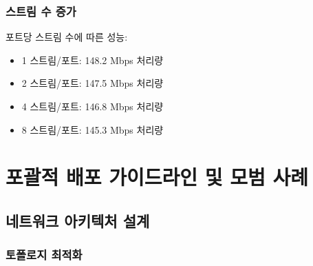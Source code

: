 \documentclass[twocolumn,10pt]{article}
\begin{document}
\subsubsection{스트림 수 증가}

포트당 스트림 수에 따른 성능:

\begin{itemize}
    \item 1 스트림/포트: 148.2 Mbps 처리량
    \item 2 스트림/포트: 147.5 Mbps 처리량
    \item 4 스트림/포트: 146.8 Mbps 처리량
    \item 8 스트림/포트: 145.3 Mbps 처리량
\end{itemize}

\section{포괄적 배포 가이드라인 및 모범 사례}
\label{sec:deployment_guidelines}

\subsection{네트워크 아키텍처 설계}

\subsubsection{토폴로지 최적화}
\end{document}
